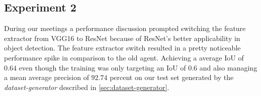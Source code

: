 \subsection{Experiment 2}
During our meetings a performance discussion prompted switching the feature extractor from VGG16\cite{VGG16} to ResNet\cite{ResNet} because of ResNet's better applicability in object detection.
The feature extractor switch resulted in a pretty noticeable performance spike in comparison to the old agent.
Achieving a average IoU of $0.64$ even though the training was only targeting an IoU of $0.6$ and also managing a mean average precision of $92.74$ percent on our test set generated by the \textit{dataset-generator} described in \ref{sec:dataset-generator}.